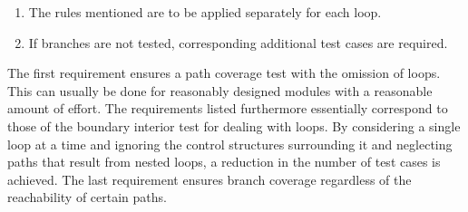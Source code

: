 	\begin{enumerate}
			\begin{itemize}
			\end{itemize}
		\item The rules mentioned are to be applied separately for each loop.
		\item If branches are not tested, corresponding additional test cases are required.
	\end{enumerate}

	The first requirement ensures a path coverage test with the omission of loops. This can usually be done for reasonably designed modules with a reasonable amount of effort. The requirements listed furthermore essentially correspond to those of the boundary interior test for dealing with loops. By considering a single loop at a time and ignoring the control structures surrounding it and neglecting paths that result from nested loops, a reduction in the number of test cases is achieved. The last requirement ensures branch coverage regardless of the reachability of certain paths.

